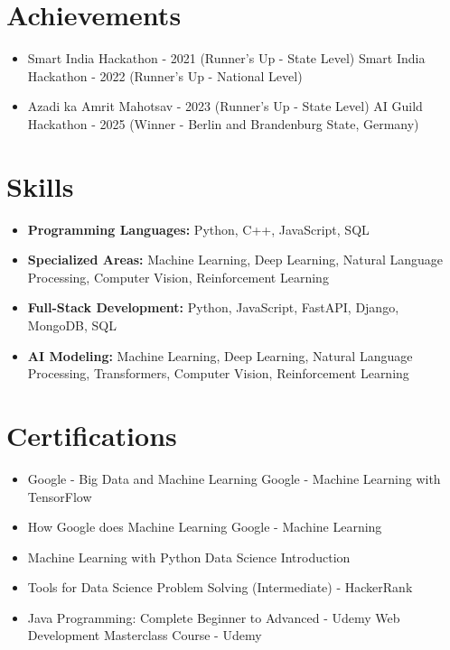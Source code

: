 \documentclass[a4paper,10pt]{article}
\begin{document}
\section*{Achievements}
\begin{itemize}
\item Smart India Hackathon - 2021 (Runner's Up - State Level) \hfill Smart India Hackathon - 2022 (Runner's Up - National Level)
\item Azadi ka Amrit Mahotsav - 2023 (Runner's Up - State Level) \hfill AI Guild Hackathon - 2025 (Winner - Berlin and Brandenburg State, Germany)
\end{itemize}

\section*{Skills}
\begin{itemize}
  \item \textbf{Programming Languages:} Python, C++, JavaScript, SQL
  \item \textbf{Specialized Areas:} Machine Learning, Deep Learning, Natural Language Processing, Computer Vision, Reinforcement Learning
  \item \textbf{Full-Stack Development:} Python, JavaScript, FastAPI, Django, MongoDB, SQL
  \item \textbf{AI Modeling:} Machine Learning, Deep Learning, Natural Language Processing, Transformers, Computer Vision, Reinforcement Learning
\end{itemize}

\section*{Certifications}
\begin{itemize}
\item Google - Big Data and Machine Learning \hfill Google - Machine Learning with TensorFlow
\item How Google does Machine Learning \hfill Google - Machine Learning
\item Machine Learning with Python \hfill Data Science Introduction
\item Tools for Data Science \hfill Problem Solving (Intermediate) - HackerRank
\item Java Programming: Complete Beginner to Advanced - Udemy \hfill Web Development Masterclass Course - Udemy
\end{itemize}
\end{document}
